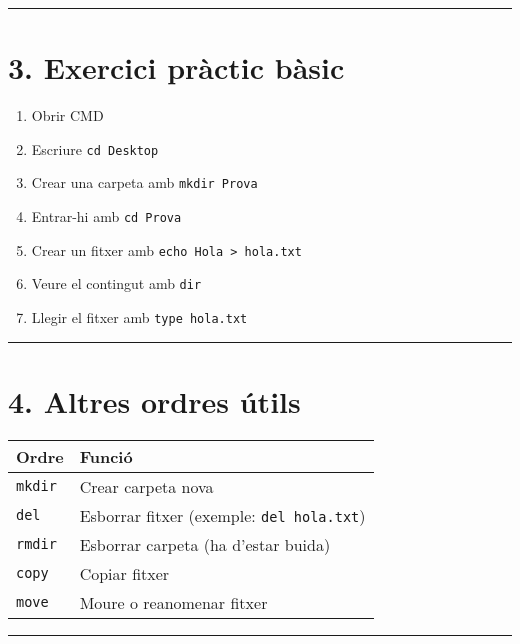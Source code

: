 \documentclass[
  a4paper,
]{article}
\providecommand{\tightlist}{%
  \setlength{\itemsep}{0pt}\setlength{\parskip}{0pt}}
\begin{document}
\begin{center}\rule{0.5\linewidth}{0.5pt}\end{center}

\section{3. Exercici pràctic bàsic}\label{exercici-pruxe0ctic-buxe0sic}

\begin{enumerate}
\def\labelenumi{\arabic{enumi}.}
\tightlist
\item
  Obrir CMD
\item
  Escriure \texttt{cd\ Desktop}
\item
  Crear una carpeta amb \texttt{mkdir\ Prova}
\item
  Entrar-hi amb \texttt{cd\ Prova}
\item
  Crear un fitxer amb \texttt{echo\ Hola\ \textgreater{}\ hola.txt}
\item
  Veure el contingut amb \texttt{dir}
\item
  Llegir el fitxer amb \texttt{type\ hola.txt}
\end{enumerate}

\begin{center}\rule{0.5\linewidth}{0.5pt}\end{center}

\section{4. Altres ordres útils}\label{altres-ordres-uxfatils}

\begin{longtable}[]{@{}ll@{}}
\toprule\noalign{}
Ordre & Funció \\
\midrule\noalign{}
\endhead
\bottomrule\noalign{}
\endlastfoot
\texttt{mkdir} & Crear carpeta nova \\
\texttt{del} & Esborrar fitxer (exemple: \texttt{del\ hola.txt}) \\
\texttt{rmdir} & Esborrar carpeta (ha d'estar buida) \\
\texttt{copy} & Copiar fitxer \\
\texttt{move} & Moure o reanomenar fitxer \\
\end{longtable}

\begin{center}\rule{0.5\linewidth}{0.5pt}\end{center}
\end{document}
